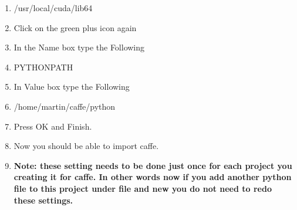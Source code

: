 \documentclass[12pt]{article}
\begin{document}
\begin{enumerate}
  \item /usr/local/cuda/lib64
  \item Click on the green plus icon again
  \item In the Name box type the Following
  \item PYTHONPATH
  \item In Value box type the Following
  \item /home/martin/caffe/python
  \item Press OK and Finish.
  \item Now you should be able to import caffe.
  \item \textbf{Note: these setting needs to be done just once for each project you creating it for caffe. In other words now if you add another python file to this project under file and new you do not need to redo these settings.}
\end{enumerate}
\end{document}
